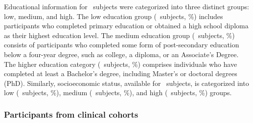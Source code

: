 Educational information for \TotalSubjectsWithEducationCount\ subjects were categorized into three distinct groups: low, medium, and high. 
The low education group (\TotalSubjectsWithLowEducationCount\ subjects, \TotalSubjectsWithLowEducationPercentage\%) includes participants 
who completed primary education or obtained a high school diploma as their highest education level. 
The medium education group (\TotalSubjectsWithMediumEducationCount\ subjects, \TotalSubjectsWithMediumEducationPercentage\%) consists 
of participants who completed some form of post-secondary education below a four-year degree, such as college, a diploma, or an Associate's Degree. 
The higher education category (\TotalSubjectsWithHighEducationCount\ subjects, \TotalSubjectsWithHighEducationPercentage\%) comprises individuals 
who have completed at least a Bachelor's degree, including Master's or doctoral degrees (PhD). 
Similarly, socioeconomic status, available for \TotalSubjectsWithSocioEconomicCount\ subjects, is categorized into 
low (\TotalSubjectsWithLowEconomicCount\ subjects, \TotalSubjectsWithLowEconomicPercentage\%), 
medium (\TotalSubjectsWithMediumEconomicCount\ subjects, \TotalSubjectsWithMediumEconomicPercentage\%), and high (\TotalSubjectsWithHighEconomicCount\ subjects, 
\TotalSubjectsWithHighEconomicPercentage\%) groups.



\subsubsection{Participants from clinical cohorts}


